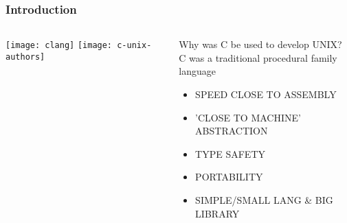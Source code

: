 \begin{frame}[plain]
	\frametitle{Introduction}
	
	
	
	\begin{columns}
		
		\begin{column}{.3\textwidth}
			
			\texttt{[image: clang]}
			\texttt{[image: c-unix-authors]}
		\end{column}
		
		\begin{column}{.7\textwidth}
			
			\Large
			Why was C be used to develop UNIX? \\
			C was a traditional procedural family language
			\normalsize
			\begin{itemize}
				\item  SPEED CLOSE TO ASSEMBLY
				\item  'CLOSE TO MACHINE' ABSTRACTION
				\item  TYPE SAFETY
				\item  PORTABILITY
				\item  SIMPLE/SMALL LANG \& BIG LIBRARY

			\end{itemize}
			
		\end{column}
		
		
	\end{columns}
	
	
\end{frame}

